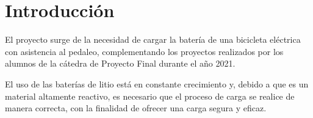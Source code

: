 \section{Introducción}






El proyecto surge de la necesidad de cargar la batería de una bicicleta eléctrica con asistencia al pedaleo,
complementando los proyectos realizados por los alumnos de la cátedra de Proyecto Final durante el año 2021.

El uso de las baterías de litio está en constante crecimiento y,
debido a que es un material altamente reactivo,
es necesario que el proceso de carga se realice de manera correcta,
con la finalidad de ofrecer una carga segura y eficaz.